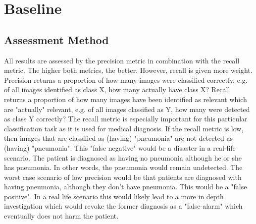 \section{Baseline}
\subsection{Assessment Method}
All results are assessed by the precision metric in combination with the recall metric. The higher both metrics, the better.  However, recall is given more weight. Precision returns a proportion of how many images were classified correctly, e.g. of all images identified as class X, how many actually have class X? Recall returns a proportion of how many images have been identified as relevant which are "actually" relevant, e.g. of all images classified as Y, how many were detected as class Y correctly? The recall metric is especially important for this particular classification task as it is used for medical diagnosis.\cite{powers2011evaluation} If the recall metric is low, then images that are classified as (having) "pneumonia" are not detected as (having) "pneumonia". This "false negative" would be a disaster in a real-life scenario. The patient is diagnosed as having no pneumonia although he or she has pneumonia. In other words, the pneumonia would remain undetected. The worst case scenario of low precision would be that patients are diagnosed with having pneumonia, although they don't have pneumonia. This would be a "false positive". In a real life scenario this would likely lead to a more in depth investigation which would revoke the former diagnosis as a "false-alarm" which eventually does not harm the patient.




